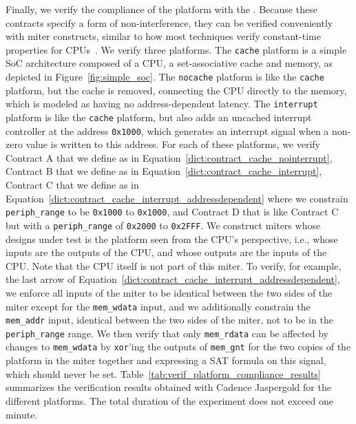 Finally, we verify the compliance of the platform with the \pic.
Because these contracts specify a form of non-interference, they can be verified conveniently with miter constructs, similar to how most techniques verify constant-time properties for CPUs~\cite{dinesh2024conjunct,dinesh2025h,wang2023specification,tan2025contractshadowlogic}.
We verify three platforms.
The \texttt{cache} platform is a simple SoC architecture composed of a CPU, a set-associative cache and memory, as depicted in Figure~\ref{fig:simple_soc}.
The \texttt{nocache} platform is like the \texttt{cache} platform, but the cache is removed, connecting the CPU directly to the memory, which is modeled as having no address-dependent latency.
The \texttt{interrupt} platform is like the \texttt{cache} platform, but also adds an uncached interrupt controller at the address \texttt{0x1000}, which generates an interrupt signal when a non-zero value is written to this address.
For each of these platforms, we verify Contract A that we define as in Equation~\ref{dict:contract_cache_nointerrupt}, Contract B that we define as in Equation~\ref{dict:contract_cache_interrupt}, Contract C that we define as in Equation~\ref{dict:contract_cache_interrupt_addressdependent} where we constrain \texttt{periph\_range} to be \texttt{0x1000} to \texttt{0x1000}, and Contract D that is like Contract C but with a \texttt{periph\_range} of \texttt{0x2000} to \texttt{0x2FFF}.
We construct miters whose designs under test is the platform seen from the CPU's perspective, i.e., whose inputs are the outputs of the CPU, and whose outputs are the inputs of the CPU.
Note that the CPU itself is not part of this miter.
To verify, for example, the last arrow of Equation~\ref{dict:contract_cache_interrupt_addressdependent}, we enforce all inputs of the miter to be identical between the two sides of the miter except for the \texttt{mem\_wdata} input, and we additionally constrain the \texttt{mem\_addr} input, identical between the two sides of the miter, not to be in the \texttt{periph\_range} range.
We then verify that only \texttt{mem\_rdata} can be affected by changes to \texttt{mem\_wdata} by \texttt{xor}'ing the outputs of \texttt{mem\_gnt} for the two copies of the platform in the miter together and expressing a SAT formula on this signal, which should never be set.
Table~\ref{tab:verif_platform_compliance_results} summarizes the verification results obtained with Cadence Jaspergold for the different platforms.
The total duration of the experiment does not exceed one minute.


